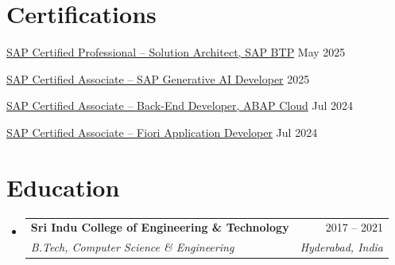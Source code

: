 \documentclass[letterpaper,11pt]{article}
\makeatletter
\newcommand{\resumeSubheading}[4]{
  \vspace{-2pt}\item
    \begin{tabular*}{0.97\textwidth}[t]{l@{\extracolsep{\fill}}r}
      \textbf{#1} & #2 \\
      \textit{\small#3} & \textit{\small #4} \\
    \end{tabular*}\vspace{-7pt}
}
\newcommand{\resumeSubHeadingListStart}{\begin{itemize}[leftmargin=0.15in, label={}]}
\newcommand{\resumeSubHeadingListEnd}{\end{itemize}}
\makeatother
\begin{document}
\section{Certifications}
  \begin{itemize}[leftmargin=0.15in, label={}, itemsep=-2pt]
    \small{
    \item \href{https://www.credly.com/badges/dc32452a-d304-42e3-a4d8-5aac36b12f97/public_url}{SAP Certified Professional -- Solution Architect, SAP BTP} \hfill \textnormal{May 2025}
    \item \href{https://www.credly.com/badges/3891602f-46f2-4cbd-a788-efba58059ccd/public_url}{SAP Certified Associate -- SAP Generative AI Developer} \hfill \textnormal{2025}
    \item \href{https://www.credly.com/badges/2f5395d5-6f9c-4238-90af-5effa19d0c1a/public_url}{SAP Certified Associate -- Back-End Developer, ABAP Cloud} \hfill \textnormal{Jul 2024}
    \item \href{https://www.credly.com/badges/5b057778-45fe-42f3-8aca-2a8c48f2b67b/public_url}{SAP Certified Associate -- Fiori Application Developer} \hfill \textnormal{Jul 2024}
    }
  \end{itemize}

\section{Education}
  \resumeSubHeadingListStart
    \resumeSubheading
      {Sri Indu College of Engineering \& Technology}{2017 -- 2021}
      {B.Tech, Computer Science \& Engineering}{Hyderabad, India}
  \resumeSubHeadingListEnd
\end{document}
